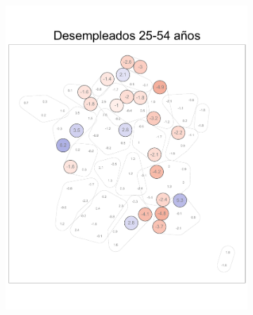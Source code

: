 \begin{figure}
\begin{subfigure}{0.275\textwidth}
	\includegraphics[width = \textwidth]{Figs/Efectos/Dorling_Efectos_Des2_Modelo_H}
	\end{subfigure}
	~
	\begin{subfigure}{0.275\textwidth}

\end{subfigure}
\end{figure}
